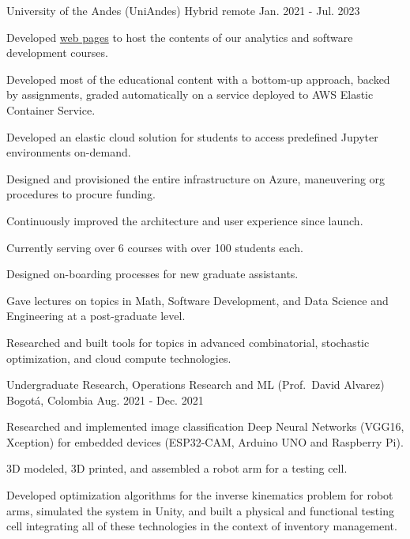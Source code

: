 \begin{cventries}
	{University of the Andes (UniAndes)} %
	{Hybrid remote} %
	{Jan. 2021 {-} Jul. 2023} %
	{
		\begin{cvitems} %
			\item {Developed \href{https://copa-uniandes.github.io/PAD-web-tutorials/intro.html}{web pages} to host the contents of our analytics and software development courses.}
			\item {Developed most of the educational content with a bottom-up approach, backed by assignments, graded automatically on a service deployed to AWS Elastic Container Service.}
			\item {Developed an elastic cloud solution for students to access predefined Jupyter environments on-demand.}
			\item {Designed and provisioned the entire infrastructure on Azure, maneuvering org procedures to procure funding.}
			\item {Continuously improved the architecture and user experience since launch.}
			\item {Currently serving over 6 courses with over 100 students each.}
			\item {Designed on-boarding processes for new graduate assistants.}
			\item {Gave lectures on topics in Math, Software Development, and Data Science and Engineering at a post-graduate level.}
			\item {Researched and built tools for topics in advanced combinatorial, stochastic optimization, and cloud compute technologies.}
		\end{cvitems}
	}

	{Undergraduate Research, Operations Research and ML (Prof.\ David Alvarez)} %
	{Bogotá, Colombia} %
	{Aug. 2021 {-} Dec. 2021} %
	{
		\begin{cvitems} %
			\item {Researched and implemented image classification Deep Neural Networks (VGG16, Xception) for embedded devices (ESP32-CAM, Arduino UNO and Raspberry Pi).}
			\item {3D modeled, 3D printed, and assembled a robot arm for a testing cell.}
			\item {Developed optimization algorithms for the inverse kinematics problem for robot arms, simulated the system in Unity, and built a physical and functional testing cell integrating all of these technologies in the context of inventory management.}
		\end{cvitems}
	}


\end{cventries}
